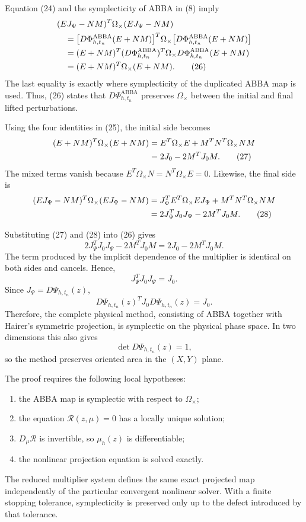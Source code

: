 \documentclass[11pt,a4paper]{article}
\newcommand{\Om}{\Omega_{\times}}
\newcommand{\PhiAB}{\Phi^{\mathrm{ABBA}}_{h,t_n}}
\begin{document}
Equation (24) and the symplecticity of ABBA in (8) imply
\begin{align}
 &(EJ_\Psi-NM)^T\Om(EJ_\Psi-NM) \notag\\
 &\quad=\bigl[D\PhiAB(E+NM)\bigr]^T
          \Om
          \bigl[D\PhiAB(E+NM)\bigr] \notag\\
 &\quad=(E+NM)^T
          (D\PhiAB)^T\Om D\PhiAB
          (E+NM) \notag\\
 &\quad=(E+NM)^T\Om(E+NM). \tag{26}
\end{align}
The last equality is exactly where symplecticity of the duplicated ABBA map is used.
Thus, (26) states that $D\PhiAB$ preserves $\Om$ between the initial and final lifted perturbations.

Using the four identities in (25), the initial side becomes
\begin{align}
 (E+NM)^T\Om(E+NM)
 &=E^T\Om E+M^TN^T\Om NM \notag\\
 &=2J_0-2M^TJ_0M. \tag{27}
\end{align}
The mixed terms vanish because $E^T\Om N=N^T\Om E=0$. Likewise, the final side is
\begin{align}
 (EJ_\Psi-NM)^T\Om(EJ_\Psi-NM)
 &=J_\Psi^TE^T\Om EJ_\Psi+M^TN^T\Om NM \notag\\
 &=2J_\Psi^TJ_0J_\Psi-2M^TJ_0M. \tag{28}
\end{align}

Substituting (27) and (28) into (26) gives
\[
 2J_\Psi^TJ_0J_\Psi-2M^TJ_0M
 =2J_0-2M^TJ_0M. \tag{29}
\]
The term produced by the implicit dependence of the multiplier is identical on both sides
and cancels. Hence,
\[
 \boxed{J_\Psi^TJ_0J_\Psi=J_0.} \tag{30}
\]
Since $J_\Psi=D\Psi_{h,t_n}(z)$,
\[
 \boxed{
 D\Psi_{h,t_n}(z)^T J_0D\Psi_{h,t_n}(z)=J_0.
 } \tag{31}
\]
Therefore, the complete physical method, consisting of ABBA together with Hairer's
symmetric projection, is symplectic on the physical phase space. In two dimensions this also gives
\[
 \det D\Psi_{h,t_n}(z)=1,
\]
so the method preserves oriented area in the $(X,Y)$ plane.

The proof requires the following local hypotheses:
\begin{enumerate}
 \item the ABBA map is symplectic with respect to $\Om$;
 \item the equation $\mathcal R(z,\mu)=0$ has a locally unique solution;
 \item $D_\mu\mathcal R$ is invertible, so $\mu_h(z)$ is differentiable;
 \item the nonlinear projection equation is solved exactly.
\end{enumerate}
The reduced multiplier system defines the same exact projected map independently of the
particular convergent nonlinear solver. With a finite stopping tolerance, symplecticity is
preserved only up to the defect introduced by that tolerance.
\end{document}
